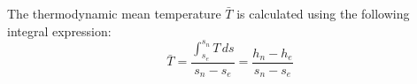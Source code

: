 The thermodynamic mean temperature \( \bar{T} \) is calculated using the following integral expression:  
\[
\bar{T} = \frac{\int_{s_e}^{s_n} T \, ds}{s_n - s_e} = \frac{h_n - h_e}{s_n - s_e}
\]